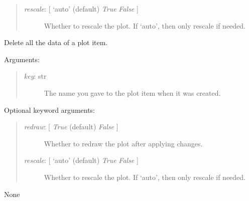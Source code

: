\documentclass[letterpaper,10pt,english]{sphinxmanual}
\begin{document}
\begin{fulllineitems}
\begin{fulllineitems}
\begin{quote}
\begin{description}
\item[{\emph{rescale}: {[} `auto' (default) \textbar{} \emph{True} \textbar{} \emph{False} {]}}] \leavevmode
Whether to rescale the plot. If `auto', then only rescale if needed.

\end{description}
\end{quote}

\end{fulllineitems}


\begin{fulllineitems}
\label{api:controls.Plot2D.clear_data}
Delete all the data of a plot item.

Arguments:
\begin{quote}
\begin{description}
\item[{\emph{key}: str}] \leavevmode
The name you gave to the plot item when it was created.

\end{description}
\end{quote}

Optional keyword arguments:
\begin{quote}
\begin{description}
\item[{\emph{redraw}: {[} \emph{True}  (default) \textbar{} \emph{False} {]}}] \leavevmode
Whether to redraw the plot after applying changes.

\item[{\emph{rescale}: {[} `auto' (default) \textbar{} \emph{True} \textbar{} \emph{False} {]}}] \leavevmode
Whether to rescale the plot. If `auto', then only rescale if needed.

\end{description}
\end{quote}

\end{fulllineitems}


\begin{fulllineitems}
\label{api:controls.Plot2D.clear_events}
None

\end{fulllineitems}


\end{fulllineitems}
\end{document}
